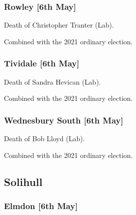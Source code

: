\documentclass[a4paper,openany]{book}
\begin{document}
\begin{resultsiii}
\subsubsection*{Rowley \hspace*{\fill}\nolinebreak[1]%
	\enspace\hspace*{\fill}
	[6th May]}


Death of Christopher Tranter (Lab).

Combined with the 2021 ordinary election.

\subsubsection*{Tividale \hspace*{\fill}\nolinebreak[1]%
	\enspace\hspace*{\fill}
	[6th May]}


Death of Sandra Hevican (Lab).

Combined with the 2021 ordinary election.

\subsubsection*{Wednesbury South \hspace*{\fill}\nolinebreak[1]%
	\enspace\hspace*{\fill}
	[6th May]}


Death of Bob Lloyd (Lab).

Combined with the 2021 ordinary election.

\subsection*{Solihull}

\subsubsection*{Elmdon \hspace*{\fill}\nolinebreak[1]%
	\enspace\hspace*{\fill}
	[6th May]}



\end{resultsiii}
\end{document}
